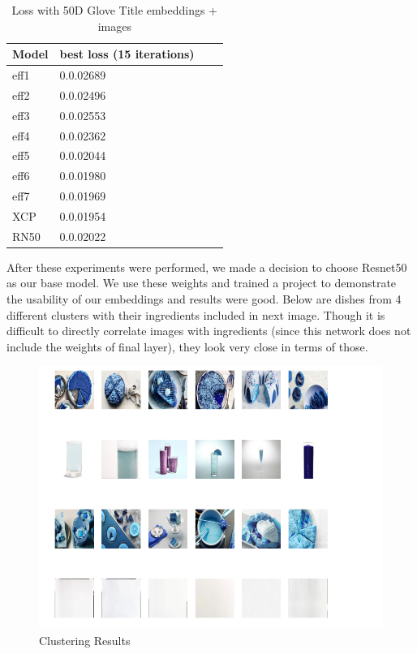 \documentclass{article}
\begin{document}
\begin{table}[h]
\begin{center}
\begin{tabular}{| l | l | l | l |}
\hline
Model &	best loss (15 iterations)\\ \hline
eff1 & 0.0.02689\\ \hline
eff2 & 0.0.02496 \\ \hline
eff3 & 0.0.02553 \\ \hline
eff4 & 0.0.02362 \\ \hline
eff5 & 0.0.02044\\ \hline
eff6 & 0.0.01980\\ \hline
eff7 & 0.0.01969 \\ \hline
XCP &  0.0.01954 \\ \hline
RN50 & 0.0.02022 \\ \hline
\end{tabular}
\end{center}
\caption{\label{tab:table-4}Loss with 50D Glove Title embeddings + images}
\end{table}
After these experiments were performed, we made a decision to choose Resnet50 as our base model. We use these weights and trained a project to demonstrate the usability of our embeddings and results were good. Below are dishes from 4 different clusters with their ingredients included in next image. Though it is difficult to directly correlate images with ingredients (since this network does not include the weights of final layer), they look very close in terms of those.
\begin{figure}[H]
\includegraphics[width=5in]{Screenshot from 2021-12-10 22-01-07.png}
\caption{Clustering Results}
\end{figure}
\end{document}
